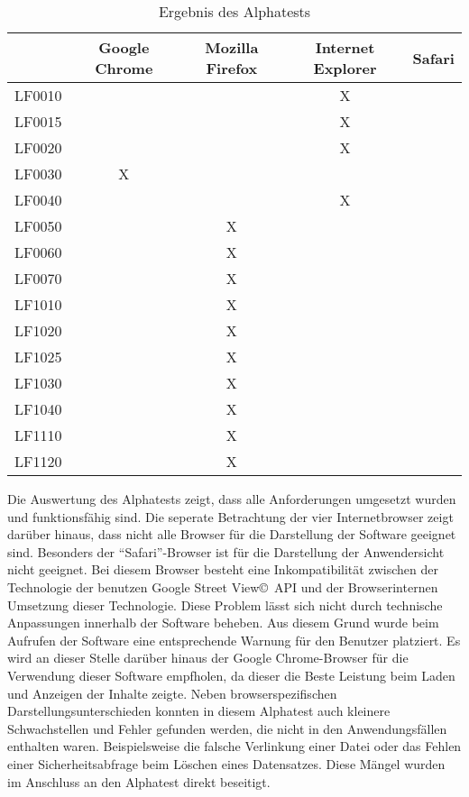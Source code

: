 \begin{table}[htbp]
  \centering
    \begin{tabular}{l|cccc}
    \toprule
          & Google Chrome & Mozilla Firefox & Internet Explorer & Safari \\
    \midrule
    LF0010 &       &       & X     &  \\
    LF0015 &       &       & X     &  \\
    LF0020 &       &       & X     &  \\
    LF0030 & X     &       &       &  \\
    LF0040 &       &       & X     &  \\
    LF0050 &       & X     &       &  \\
    LF0060 &       & X     &       &  \\
    LF0070 &       & X     &       &  \\
    LF1010 &       & X     &       &  \\
    LF1020 &       & X     &       &  \\
    LF1025 &       & X     &       &  \\
    LF1030 &       & X     &       &  \\
    LF1040 &       & X     &       &  \\
    LF1110 &       & X     &       &  \\
    LF1120 &       & X     &       &  \\
    \bottomrule
    \end{tabular}
  \caption{Ergebnis des Alphatests}
  \label{tab:ErgebnisAlphatest}
\end{table}


Die Auswertung des Alphatests zeigt, dass alle Anforderungen umgesetzt wurden und funktionsfähig sind. Die seperate Betrachtung der vier Internetbrowser zeigt darüber hinaus, dass nicht alle Browser für die Darstellung der Software geeignet sind. Besonders der "`Safari"'-Browser ist für die Darstellung der Anwendersicht nicht geeignet. Bei diesem Browser besteht eine Inkompatibilität zwischen der Technologie der benutzen Google Street View\copyright\ API und der Browserinternen Umsetzung dieser Technologie. Diese Problem lässt sich nicht durch technische Anpassungen innerhalb der Software beheben. Aus diesem Grund wurde beim Aufrufen der Software eine entsprechende Warnung für den Benutzer platziert. Es wird an dieser Stelle darüber hinaus der Google Chrome-Browser für die Verwendung dieser Software empfholen, da dieser die Beste Leistung beim Laden und Anzeigen der Inhalte zeigte. Neben browserspezifischen Darstellungsunterschieden konnten in diesem Alphatest auch kleinere Schwachstellen und Fehler gefunden werden, die nicht in den Anwendungsfällen enthalten waren. Beispielsweise die falsche Verlinkung einer Datei oder das Fehlen einer Sicherheitsabfrage beim Löschen eines Datensatzes. Diese Mängel wurden im Anschluss an den Alphatest direkt beseitigt.